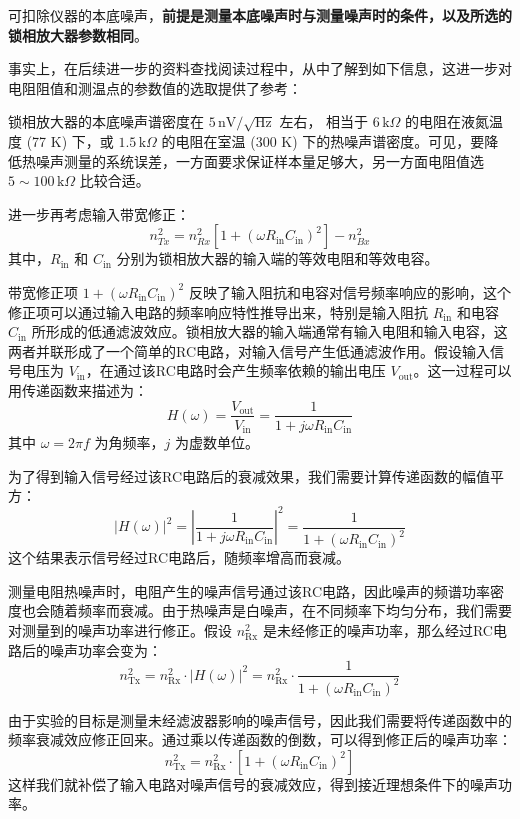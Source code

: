\begin{enumerate}
	可扣除仪器的本底噪声，\textbf{前提是测量本底噪声时与测量噪声时的条件，以及所选的锁相放大器参数相同}。
	
	事实上，在后续进一步的资料查找阅读过程中，从\cite{g}中了解到如下信息，这进一步对电阻阻值和测温点的参数值的选取提供了参考：
	
	锁相放大器的本底噪声谱密度在 $5 \, \text{nV}/\sqrt{\text{Hz}}$ 左右， 相当于 $6 \, \text{k}\Omega$ 的电阻在液氮温度 (77 K) 下，或 $1.5 \, \text{k}\Omega$ 的电阻在室温 (300 K) 下的热噪声谱密度。可见，要降低热噪声测量的系统误差，一方面要求保证样本量足够大，另一方面电阻值选 $5 \sim 100 \, \text{k}\Omega$ 比较合适。
	
	进一步再考虑输入带宽修正：
	\[
	n_{Tx}^2 = n_{Rx}^2 \left[ 1 + (\omega R_{\text{in}} C_{\text{in}})^2 \right] - n_{Bx}^2
	\]
	其中，$R_{\text{in}}$ 和 $C_{\text{in}}$ 分别为锁相放大器的输入端的等效电阻和等效电容。
	
	带宽修正项 \(1 + (\omega R_{\text{in}}C_{\text{in}})^2\) 反映了输入阻抗和电容对信号频率响应的影响，这个修正项可以通过输入电路的频率响应特性推导出来，特别是输入阻抗 \( R_{\text{in}} \) 和电容 \( C_{\text{in}} \) 所形成的低通滤波效应。锁相放大器的输入端通常有输入电阻和输入电容，这两者并联形成了一个简单的RC电路，对输入信号产生低通滤波作用。假设输入信号电压为 \( V_{\text{in}} \)，在通过该RC电路时会产生频率依赖的输出电压 \( V_{\text{out}} \)。这一过程可以用传递函数来描述为：
	\[
	H(\omega) = \frac{V_{\text{out}}}{V_{\text{in}}} = \frac{1}{1 + j\omega R_{\text{in}} C_{\text{in}}}
	\]
	其中 \( \omega = 2\pi f \) 为角频率，\( j \) 为虚数单位。
	
	为了得到输入信号经过该RC电路后的衰减效果，我们需要计算传递函数的幅值平方：
	\[
	|H(\omega)|^2 = \left| \frac{1}{1 + j\omega R_{\text{in}} C_{\text{in}}} \right|^2 = \frac{1}{1 + (\omega R_{\text{in}} C_{\text{in}})^2}
	\]
	这个结果表示信号经过RC电路后，随频率增高而衰减。
	
	测量电阻热噪声时，电阻产生的噪声信号通过该RC电路，因此噪声的频谱功率密度也会随着频率而衰减。由于热噪声是白噪声，在不同频率下均匀分布，我们需要对测量到的噪声功率进行修正。假设 \( n_{\text{Rx}}^2 \) 是未经修正的噪声功率，那么经过RC电路后的噪声功率会变为：
	\[
	n_{\text{Tx}}^2 = n_{\text{Rx}}^2 \cdot |H(\omega)|^2 = n_{\text{Rx}}^2 \cdot \frac{1}{1 + (\omega R_{\text{in}} C_{\text{in}})^2}
	\]
	
	由于实验的目标是测量未经滤波器影响的噪声信号，因此我们需要将传递函数中的频率衰减效应修正回来。通过乘以传递函数的倒数，可以得到修正后的噪声功率：
	\[
	n_{\text{Tx}}^2 = n_{\text{Rx}}^2 \cdot \left[ 1 + (\omega R_{\text{in}} C_{\text{in}})^2 \right]
	\]
	这样我们就补偿了输入电路对噪声信号的衰减效应，得到接近理想条件下的噪声功率。
	

\end{enumerate}
